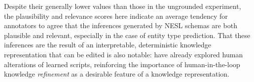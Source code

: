 Despite their generally lower values than those in the ungrounded experiment, the plausibility and relevance scores here indicate an average tendency for annotators to agree that the inferences generated by NESL schemas are both plausible and relevant, especially in the case of entity type prediction. That these inferences are the result of an interpretable, deterministic knowledge representation that can be edited is also notable: \citet{weber2022human} have already explored human alterations of learned scripts, reinforcing the importance of human-in-the-loop knowledge \textit{refinement} as a desirable feature of a knowledge representation.